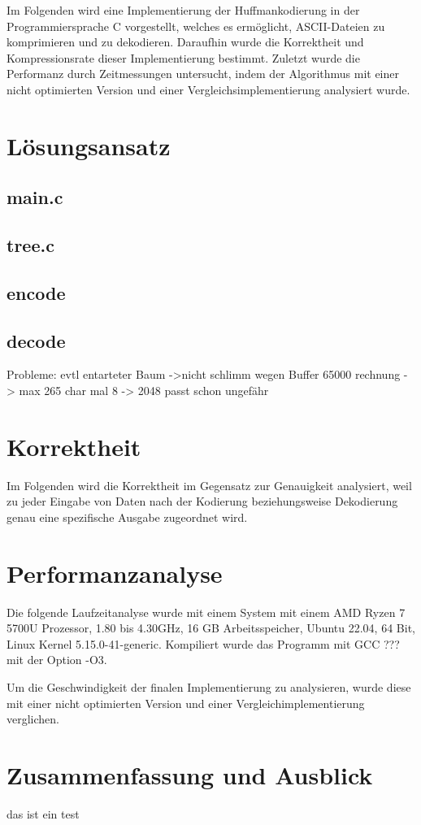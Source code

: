 \documentclass[course=erap]{aspdoc}
\begin{document}
Im Folgenden wird eine Implementierung der Huffmankodierung in der Programmiersprache C vorgestellt, welches es ermöglicht, ASCII-Dateien zu komprimieren und zu dekodieren. Daraufhin wurde die Korrektheit und Kompressionsrate %
dieser Implementierung bestimmt. Zuletzt wurde die Performanz durch Zeitmessungen untersucht, indem der Algorithmus mit einer nicht optimierten Version und einer Vergleichsimplementierung analysiert wurde.

\section{Lösungsansatz}
\subsection{main.c}
\subsection{tree.c}

\subsection{encode}
\subsection{decode}

Probleme: evtl entarteter Baum ->nicht schlimm wegen Buffer 65000 rechnung -> max 265 char mal 8 -> 2048 passt schon ungefähr


\section{Korrektheit}

Im Folgenden wird die Korrektheit im Gegensatz zur Genauigkeit analysiert, weil zu jeder Eingabe von Daten nach der Kodierung beziehungsweise Dekodierung genau eine spezifische Ausgabe zugeordnet wird.

\section{Performanzanalyse}

Die folgende Laufzeitanalyse wurde mit einem System mit einem AMD Ryzen 7 5700U Prozessor, 1.80 bis 4.30GHz, 16 GB Arbeitsspeicher, Ubuntu 22.04, 64 Bit, Linux Kernel 5.15.0-41-generic. Kompiliert wurde das Programm mit GCC ??? mit der Option -O3.

Um die Geschwindigkeit der finalen Implementierung zu analysieren, wurde diese mit einer nicht optimierten Version und einer Vergleichimplementierung verglichen.

\section{Zusammenfassung und Ausblick}
das ist ein test


{}
\end{document}
